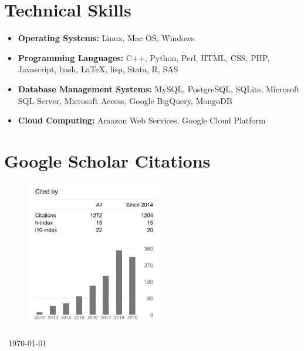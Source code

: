 \documentclass[paper=letter,fontsize=10pt]{scrartcl} %
\newcommand{\NewPart}[2]{\section*{{#1} #2}}
\begin{document}

\NewPart{Technical Skills}{}
\begin{itemize}%
\item[\faLinux] \textbf{Operating Systems:} Linux, Mac OS, Windows
\item[\faCode] \textbf{Programming Languages:} C++, Python, Perl, HTML, CSS, PHP, Javascript, bash, \LaTeX, lisp, Stata, R, SAS
\item[\faDatabase] \textbf{Database Management Systems:} MySQL, PostgreSQL, SQLite, Microsoft SQL Server, Microsoft Access, Google BigQuery, MongoDB
\item[\faCloud] \textbf{Cloud Computing:} Amazon Web Services, Google Cloud Platform
\end{itemize}

\NewPart{Google Scholar Citations}{}
\begin{figure}[H]
  \includegraphics[width=60mm]{citation_091017.png}
\end{figure}

\vspace{36pt}

{\centering \faCalendarCheckO~\today \par}
\end{document}
